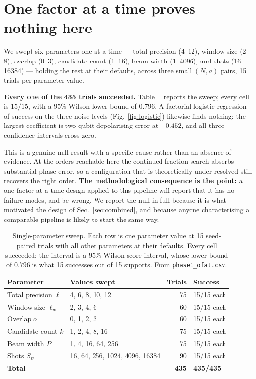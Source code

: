 \section{One factor at a time proves nothing here}
\label{sec:ofat}

We swept six parameters one at a time --- total precision (4--12), window
size (2--8), overlap (0--3), candidate count (1--16), beam width (1--4096),
and shots (16--16384) --- holding the rest at their defaults, across three
small $(N,a)$ pairs, 15 trials per parameter value.

\textbf{Every one of the 435 trials succeeded.} Table~\ref{tab:ofat}
reports the sweep; every cell is $15/15$, with a $95\%$ Wilson lower bound of
$0.796$. A factorial logistic regression of success on the three noise
levels (Fig.~\ref{fig:logistic}) likewise finds nothing: the largest
coefficient is two-qubit depolarising error at $-0.452$, and all three
confidence intervals cross zero.

This is a genuine null result with a specific cause rather than an absence of
evidence. At the orders reachable here the continued-fraction search absorbs
substantial phase error, so a configuration that is theoretically
under-resolved still recovers the right order. \textbf{The methodological
consequence is the point:} a one-factor-at-a-time design applied to this
pipeline will report that it has no failure modes, and be wrong. We report
the null in full because it is what motivated the design of
Sec.~\ref{sec:combined}, and because anyone characterising a comparable
pipeline is likely to start the same way.

\begin{table}[htbp]
\centering\small
\caption{Single-parameter sweep. Each row is one parameter value at 15
seed-paired trials with all other parameters at their defaults. Every cell
succeeded; the interval is a $95\%$ Wilson score interval, whose lower bound
of $0.796$ is what 15 successes out of 15 supports. From
\texttt{phase1\_ofat.csv}.}
\label{tab:ofat}
\begin{tabular}{@{}llrl@{}}
\toprule
Parameter & Values swept & Trials & Success \\
\midrule
Total precision $\ell$   & 4, 6, 8, 10, 12          & 75 & 15/15 each \\
Window size $\ell_w$     & 2, 3, 4, 6               & 60 & 15/15 each \\
Overlap $o$              & 0, 1, 2, 3               & 60 & 15/15 each \\
Candidate count $k$      & 1, 2, 4, 8, 16           & 75 & 15/15 each \\
Beam width $P$           & 1, 4, 16, 64, 256        & 75 & 15/15 each \\
Shots $S_w$              & 16, 64, 256, 1024, 4096, 16384 & 90 & 15/15 each \\
\midrule
\textbf{Total}           &                          & \textbf{435} & \textbf{435/435} \\
\bottomrule
\end{tabular}
\end{table}

